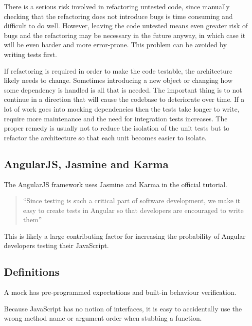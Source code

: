 \documentclass[11pt]{article}
\begin{document}
There is a serious risk involved in refactoring untested code\cite[p.~17]{Refactoring}, since manually checking that the refactoring does not introduce bugs is time consuming and difficult to do well. However, leaving the code untested means even greater risk of bugs and the refactoring may be necessary in the future anyway, in which case it will be even harder and more error-prone. This problem can be avoided by writing tests first.

If refactoring is required in order to make the code testable, the architecture likely needs to change. Sometimes introducing a new object or changing how some dependency is handled is all that is needed. The important thing is to not continue in a direction that will cause the codebase to deteriorate over time. \cite[question~34]{Stenmark} If a lot of work goes into mocking dependencies then the tests take longer to write, require more maintenance and the need for integration tests increases. The proper remedy is usually not to reduce the isolation of the unit tests but to refactor the architecture so that each unit becomes easier to isolate. \cite[question~42]{Stenmark}

\subsection{AngularJS, Jasmine and Karma}

The AngularJS framework uses Jasmine and Karma in the official tutorial.

\begin{quote}
``Since testing is such a critical part of software development, we make it easy to create tests in Angular so that developers are encouraged to write them''\cite{AngularTemplates}
\end{quote}

This is likely a large contributing factor for increasing the probability of Angular developers testing their JavaScript.

\subsection{Definitions}

A mock has pre-programmed expectations and built-in behaviour verification\cite[p.~453]{Tddjs}.

Because JavaScript has no notion of interfaces, it is easy to accidentally use the wrong method name or argument order when stubbing a function\cite[p.~471]{Tddjs}.
\end{document}

